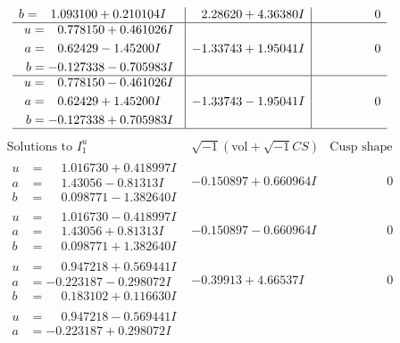 \documentclass[1p]{elsarticle_modified}
\theoremstyle{definition}
\newcommand{\I}{\sqrt{-1}}
\begin{document}
$$\begin{array}{c|c|c}
\begin{aligned}
b &= \phantom{-}1.093100 + 0.210104 I\end{aligned}
 & \phantom{-}2.28620 + 4.36380 I & \phantom{-0.000000 } 0 \\ \hline\begin{aligned}
u &= \phantom{-}0.778150 + 0.461026 I \\
a &= \phantom{-}0.62429 - 1.45200 I \\
b &= -0.127338 - 0.705983 I\end{aligned}
 & -1.33743 + 1.95041 I & \phantom{-0.000000 } 0 \\ \hline\begin{aligned}
u &= \phantom{-}0.778150 - 0.461026 I \\
a &= \phantom{-}0.62429 + 1.45200 I \\
b &= -0.127338 + 0.705983 I\end{aligned}
 & -1.33743 - 1.95041 I & \phantom{-0.000000 } 0\\
 \hline 
 \end{array}$$\newpage$$\begin{array}{c|c|c}  
\text{Solutions to }I^u_{1}& \I (\text{vol} + \sqrt{-1}CS) & \text{Cusp shape}\\
 \hline 
\begin{aligned}
u &= \phantom{-}1.016730 + 0.418997 I \\
a &= \phantom{-}1.43056 - 0.81313 I \\
b &= \phantom{-}0.098771 - 1.382640 I\end{aligned}
 & -0.150897 + 0.660964 I & \phantom{-0.000000 } 0 \\ \hline\begin{aligned}
u &= \phantom{-}1.016730 - 0.418997 I \\
a &= \phantom{-}1.43056 + 0.81313 I \\
b &= \phantom{-}0.098771 + 1.382640 I\end{aligned}
 & -0.150897 - 0.660964 I & \phantom{-0.000000 } 0 \\ \hline\begin{aligned}
u &= \phantom{-}0.947218 + 0.569441 I \\
a &= -0.223187 - 0.298072 I \\
b &= \phantom{-}0.183102 + 0.116630 I\end{aligned}
 & -0.39913 + 4.66537 I & \phantom{-0.000000 } 0 \\ \hline\begin{aligned}
u &= \phantom{-}0.947218 - 0.569441 I \\
a &= -0.223187 + 0.298072 I \\

\end{aligned}
\end{array}$$
\end{document}
